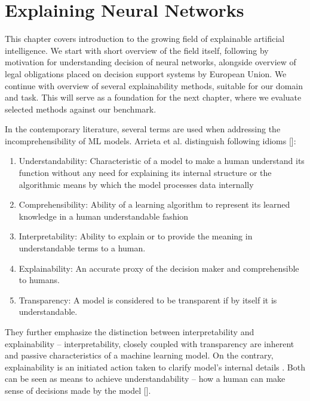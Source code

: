 \chapter{Explaining Neural Networks}


This chapter covers introduction to the growing field of explainable artificial intelligence. We start with short overview of the field itself, following by motivation for understanding decision of neural networks, alongside overview of legal obligations placed on decision support systems by European Union. We continue with overview of several explainability methods, suitable for our domain and task. This will serve as a foundation for the next chapter, where we evaluate selected methods against our benchmark.

In the contemporary literature, several terms are used when addressing the incomprehensibility of ML models. Arrieta et al. distinguish following idioms []:

\begin{enumerate}
    \item Understandability: Characteristic of a model to make a human understand its function without any need for explaining its internal structure or the algorithmic means by which the model processes data internally
    \item Comprehensibility: Ability of a learning algorithm to represent its learned knowledge in a human understandable fashion 
    \item Interpretability: Ability to explain or to provide the meaning in understandable terms to a human.
    \item Explainability: An accurate proxy of the decision maker and comprehensible to humans.
    \item Transparency: A model is considered to be transparent if by itself it is understandable.
\end{enumerate}

They further emphasize the distinction between interpretability and explainability -- interpretability, closely coupled with transparency are inherent and passive characteristics of a machine learning model. On the contrary, explainability is an initiated action taken to clarify model's internal details . Both can be seen as means to achieve understandability -- how a human can make sense of decisions made by the model [].

